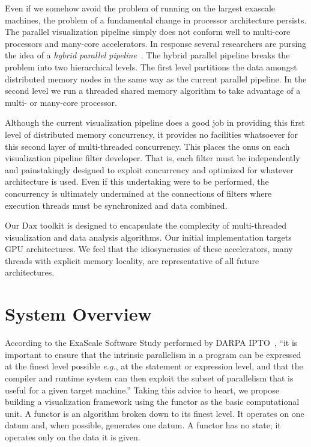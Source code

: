 \documentclass{vgtc}                          %
\newcommand*{\lcite}[1]{~\cite{#1}}
\newcommand*{\keyterm}[1]{\emph{#1}}
\begin{document}
Even if we somehow avoid the problem of running on the largest exascale
machines, the problem of a fundamental change in processor architecture
persists.  The parallel visualization pipeline simply does not conform well
to multi-core processors and many-core accelerators.  In response several
researchers are pursing the idea of a \keyterm{hybrid parallel
  pipeline}\lcite{Camp10,Howison11,Li08}.  The hybrid parallel pipeline
breaks the problem into two hierarchical levels.  The first level
partitions the data amongst distributed memory nodes in the same way as the
current parallel pipeline.  In the second level we run a threaded shared
memory algorithm to take advantage of a multi- or many-core processor.

Although the current visualization pipeline does a good job in providing
this first level of distributed memory concurrency, it provides no
facilities whatsoever for this second layer of multi-threaded concurrency.
This places the onus on each visualization pipeline filter developer.  That
is, each filter must be independently and painstakingly designed to exploit
concurrency and optimized for whatever architecture is used.  Even if this
undertaking were to be performed, the concurrency is ultimately undermined
at the connections of filters where execution threads must be synchronized
and data combined.

Our Dax toolkit is designed to encapsulate the complexity of multi-threaded
visualization and data analysis algorithms.  Our initial implementation
targets GPU architectures.  We feel that the idiosyncrasies of these
accelerators, many threads with explicit memory locality, are
representative of all future architectures.

\section{System Overview}
\label{sec:SystemOverview}

According to the ExaScale Software Study performed by DARPA
IPTO\lcite{DARPAExascaleStudy}, ``it is important to ensure that the
intrinsic parallelism in a program can be expressed at the finest level
possible \emph{e.g.}, at the statement or expression level, and that the
compiler and runtime system can then exploit the subset of parallelism that
is useful for a given target machine.''  Taking this advice to heart, we
propose building a visualization framework using the functor as the basic
computational unit.  A functor is an algorithm broken down to its finest
level.  It operates on one datum and, when possible, generates one datum.
A functor has no state; it operates only on the data it is given.
\end{document}
